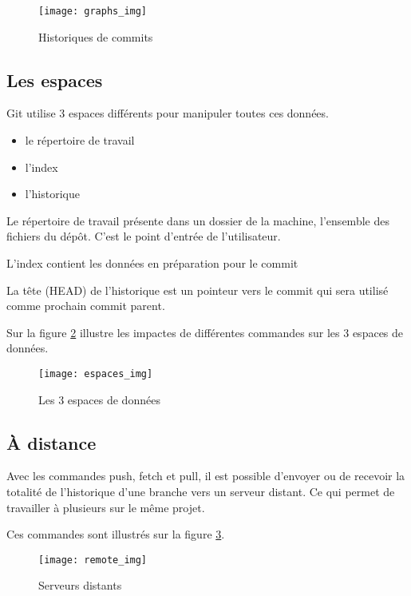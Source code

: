 \documentclass[a4paper]{article}
\begin{document}
\begin{figure}
  \center
  \texttt{[image: graphs\_img]}
  \caption{Historiques de commits}
  \label{graphs}
\end{figure}

\subsection*{Les espaces}
Git utilise 3 espaces différents pour manipuler toutes ces données.
\begin{itemize}
\item le répertoire de travail
\item l'index
\item l'historique
\end{itemize}

Le répertoire de travail présente dans un dossier de la machine, l'ensemble des fichiers du dépôt. C'est le point d'entrée de l'utilisateur.

L'index contient les données en préparation pour le commit

La tête (HEAD) de l'historique est un pointeur vers le commit qui sera utilisé comme prochain commit parent.

Sur la figure \ref{espaces} illustre les impactes de différentes commandes sur les 3 espaces de données.

\begin{figure}
  \centering
  \texttt{[image: espaces\_img]}
  \caption{Les 3 espaces de données}
  \label{espaces}
\end{figure}

\subsection*{À distance}
Avec les commandes push, fetch et pull, il est possible d'envoyer ou de recevoir la totalité de l'historique d'une branche vers un serveur distant. Ce qui permet de travailler à plusieurs sur le même projet.

Ces commandes sont illustrés sur la figure \ref{remote}.

\vspace{2mm}

\begin{figure}
  \center
  \texttt{[image: remote\_img]}
  \caption{Serveurs distants}
  \label{remote}
\end{figure}
\end{document}
